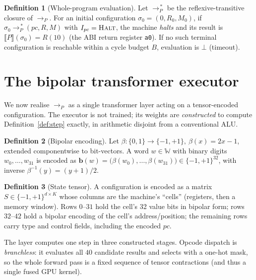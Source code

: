 \documentclass[11pt]{article}
\theoremstyle{definition}
\newtheorem{definition}{Definition}
\theoremstyle{plain}
\theoremstyle{remark}
\newcommand{\Word}{\mathbb{W}}
\newcommand{\step}{\longrightarrow}
\newcommand{\bp}{\{-1,+1\}}
\newcommand{\sem}[1]{\llbracket #1 \rrbracket}
\begin{document}
\begin{definition}[Whole-program evaluation]
Let $\step_P^{\,*}$ be the reflexive-transitive closure of $\step_P$. For an initial configuration
$\sigma_0=(0,R_0,M_0)$, if $\sigma_0 \step_P^{\,*} (pc,R,M)$ with $I_{pc}=\textsc{Halt}$, the machine
\emph{halts} and its result is $\sem{P}(\sigma_0) = R(10)$ (the ABI return register \texttt{a0}). If no
such terminal configuration is reachable within a cycle budget $B$, evaluation is $\bot$ (timeout).
\end{definition}

\section{The bipolar transformer executor}\label{sec:transformer}

We now realise $\step_P$ as a single transformer layer acting on a tensor-encoded configuration. The
executor is not trained; its weights are \emph{constructed} to compute Definition~\ref{def:step}
exactly, in arithmetic disjoint from a conventional ALU.

\begin{definition}[Bipolar encoding]
Let $\beta : \{0,1\} \to \bp,\ \beta(x) = 2x-1$, extended componentwise to bit-vectors. A word
$w\in\Word$ with binary digits $w_0,\dots,w_{31}$ is encoded as
$\mathbf{b}(w) = \big(\beta(w_0),\dots,\beta(w_{31})\big) \in \bp^{32}$, with inverse
$\beta^{-1}(y) = (y{+}1)/2$.
\end{definition}

\begin{definition}[State tensor]
A configuration is encoded as a matrix $S \in \bp^{d \times K}$ whose columns are the machine's
``cells'' (registers, then a memory window). Rows $0\text{--}31$ hold the cell's 32 value bits in
bipolar form; rows $32\text{--}42$ hold a bipolar encoding of the cell's address/position; the
remaining rows carry type and control fields, including the encoded $pc$.
\end{definition}

The layer computes one step in three constructed stages. Opcode dispatch is \emph{branchless}: it
evaluates all $40$ candidate results and selects with a one-hot mask, so the whole forward pass is a
fixed sequence of tensor contractions (and thus a single fused GPU kernel).
\end{document}
